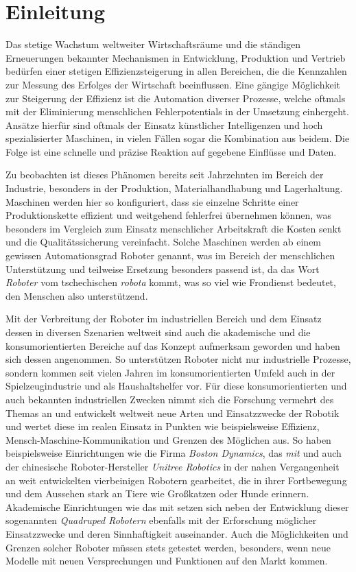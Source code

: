 \section{Einleitung}
\label{sec:einleitung}

Das stetige Wachstum weltweiter Wirtschaftsräume und die ständigen Erneuerungen bekannter Mechanismen in Entwicklung,
Produktion und Vertrieb bedürfen einer stetigen Effizienzsteigerung in allen Bereichen, die die Kennzahlen zur Messung
des Erfolges der Wirtschaft beeinflussen.
Eine gängige Möglichkeit zur Steigerung der Effizienz ist die Automation diverser Prozesse, welche oftmals mit der Eliminierung
menschlichen Fehlerpotentials in der Umsetzung einhergeht.
Ansätze hierfür sind oftmals der Einsatz künstlicher Intelligenzen und hoch spezialisierter Maschinen, in vielen Fällen
sogar die Kombination aus beidem.
Die Folge ist eine schnelle und präzise Reaktion auf gegebene Einflüsse und Daten.

Zu beobachten ist dieses Phänomen bereits seit Jahrzehnten im Bereich der Industrie, besonders in der Produktion,
Materialhandhabung und Lagerhaltung.
Maschinen werden hier so konfiguriert, dass sie einzelne Schritte einer Produktionskette effizient und weitgehend fehlerfrei
übernehmen können, was besonders im Vergleich zum Einsatz menschlicher Arbeitskraft die Kosten senkt und die Qualitätssicherung
vereinfacht.
Solche Maschinen werden ab einem gewissen Automationsgrad Roboter genannt, was im Bereich der menschlichen Unterstützung
und teilweise Ersetzung besonders passend ist, da das Wort \emph{Roboter} vom tschechischen \emph{robota} kommt, was so viel wie
Frondienst bedeutet, den Menschen also unterstützend.

Mit der Verbreitung der Roboter im industriellen Bereich und dem Einsatz dessen in diversen Szenarien weltweit sind
auch die akademische und die konsumorientierten Bereiche auf das Konzept aufmerksam geworden und haben sich dessen angenommen.
So unterstützen Roboter nicht nur industrielle Prozesse, sondern kommen seit vielen Jahren im konsumorientierten
Umfeld auch in der Spielzeugindustrie und als Haushaltshelfer vor.
Für diese konsumorientierten und auch bekannten industriellen Zwecken nimmt sich die Forschung vermehrt des Themas an und
entwickelt weltweit neue Arten und Einsatzzwecke der Robotik und wertet diese im realen Einsatz in Punkten wie beispielsweise
Effizienz, Mensch-Maschine-Kommunikation und Grenzen des Möglichen aus.
So haben beispielsweise Einrichtungen wie die Firma \emph{Boston Dynamics}, das \emph{\gls{mit}} und auch der chinesische
Roboter-Hersteller \emph{Unitree Robotics} in der nahen Vergangenheit an weit entwickelten vierbeinigen Robotern
gearbeitet, die in ihrer Fortbewegung und dem Aussehen stark an Tiere wie Großkatzen oder Hunde erinnern.
Akademische Einrichtungen wie das \gls{mit} setzen sich neben der Entwicklung dieser sogenannten \emph{Quadruped Robotern}
ebenfalls mit der Erforschung möglicher Einsatzzwecke und deren Sinnhaftigkeit auseinander.
Auch die Möglichkeiten und Grenzen solcher Roboter müssen stets getestet werden, besonders, wenn neue Modelle mit neuen
Versprechungen und Funktionen auf den Markt kommen.

